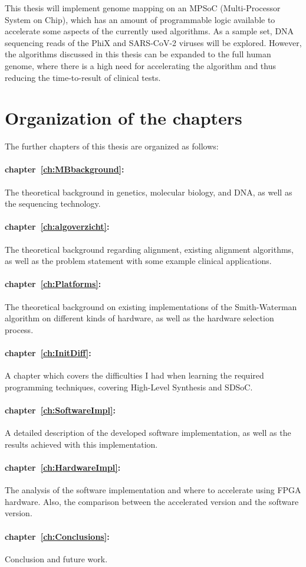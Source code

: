 This thesis will implement genome mapping on an MPSoC (Multi-Processor System on Chip), which has an amount of programmable logic available to accelerate some aspects of the currently used algorithms. As a sample set, DNA sequencing reads of the PhiX and SARS-CoV-2 viruses will be explored. However, the algorithms discussed in this thesis can be expanded to the full human genome, where there is a high need for accelerating the algorithm and thus reducing the time-to-result of clinical tests.

\section{Organization of the chapters}

The further chapters of this thesis are organized as follows:

\paragraph{chapter~\ref{ch:MBbackground}:} The theoretical background in genetics, molecular biology, and DNA, as well as the sequencing technology.
\paragraph{chapter~\ref{ch:algoverzicht}:} The theoretical background regarding alignment, existing alignment algorithms, as well as the problem statement with some example clinical applications.
\paragraph{chapter~\ref{ch:Platforms}:} The theoretical background on existing implementations of the Smith-Waterman algorithm on different kinds of hardware, as well as the hardware selection process.
\paragraph{chapter~\ref{ch:InitDiff}:} A chapter which covers the difficulties I had when learning the required programming techniques, covering High-Level Synthesis and SDSoC. 
\paragraph{chapter~\ref{ch:SoftwareImpl}:} A detailed description of the developed software implementation, as well as the results achieved with this implementation.
\paragraph{chapter~\ref{ch:HardwareImpl}:} The analysis of the software implementation and where to accelerate using FPGA hardware. Also, the comparison between the accelerated version and the software version.
\paragraph{chapter~\ref{ch:Conclusions}:} Conclusion and future work.